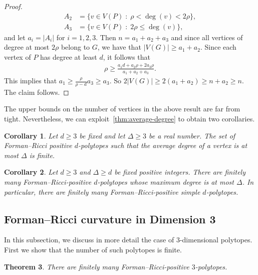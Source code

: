 \documentclass[11pt,a4paper]{amsart}
\newcommand{\avgdegree}{\rho}
\newtheorem{theorem}{Theorem}[section]
\newtheorem{corollary}[theorem]{Corollary}
\begin{document}
\begin{proof}
\begin{align*}
            A_2 &= \{v\in V(P) \;:\; \rho < \deg(v) < 2\avgdegree\},\\
            A_3 &= \{v\in V(P) \;:\; 2\rho \leq \deg(v)\},
        \end{align*}
    and let $a_i = |A_i|$ for $i=1,2,3$. Then $n=a_1+a_2+a_3$ and since all vertices of degree at most $2\avgdegree$ belong to $G$, we have that $|V(G)| \ge a_1+a_2$. Since each vertex of $P$ has degree at least $d$, it follows that
        \begin{align*}
            \avgdegree \ge \frac{a_1d +a_2\avgdegree +2a_3\avgdegree}{a_1+a_2+a_3}.
        \end{align*}
    This implies that $a_1\ge \frac{\avgdegree}{\avgdegree - d}a_3 \ge a_3$. So $2|V(G)| \ge 2(a_1+a_2) \ge n+a_2 \ge n$. The claim follows.
\end{proof}

The upper bounds on the number of vertices in the above result are far from tight. Nevertheless, we can exploit~\cref{thm:average-degree} to obtain two corollaries.

\begin{corollary}\label{cor: finiteAverage}
    Let $d\geq 3$ be fixed and let $\Delta\ge 3$ be a real number. The set of Forman--Ricci positive $d$-polytopes such that the average degree of a vertex is at most $\Delta$ is finite. 
\end{corollary}

\begin{corollary}\label{cor: finite degree}
   Let $d\ge 3$ and $\Delta\ge d$ be fixed positive integers. There are finitely many Forman--Ricci-positive $d$-polytopes whose maximum degree is at most $\Delta$. In particular, there are finitely many Forman--Ricci-positive \textit{simple} $d$-polytopes.
\end{corollary}

\subsection{Forman--Ricci curvature in Dimension 3}\label{subsec:forman-dim3}

In this subsection, we discuss in more detail the case of $3$-dimensional polytopes. First we show that the number of such polytopes is finite.

\begin{theorem}\label{thm:3dFormanFinite}
    There are finitely many Forman--Ricci-positive $3$-polytopes.
\end{theorem}
\end{document}
